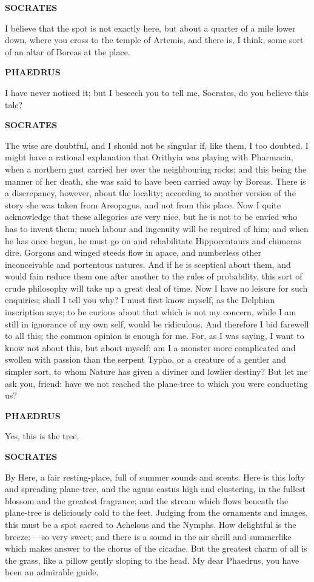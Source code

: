\documentclass[11pt,letter]{article}
\begin{document}
\par \textbf{SOCRATES}
\par   I believe that the spot is not exactly here, but about a quarter of a mile lower down, where you cross to the temple of Artemis, and there is, I think, some sort of an altar of Boreas at the place.

\par \textbf{PHAEDRUS}
\par   I have never noticed it; but I beseech you to tell me, Socrates, do you believe this tale?

\par \textbf{SOCRATES}
\par   The wise are doubtful, and I should not be singular if, like them, I too doubted. I might have a rational explanation that Orithyia was playing with Pharmacia, when a northern gust carried her over the neighbouring rocks; and this being the manner of her death, she was said to have been carried away by Boreas. There is a discrepancy, however, about the locality; according to another version of the story she was taken from Areopagus, and not from this place. Now I quite acknowledge that these allegories are very nice, but he is not to be envied who has to invent them; much labour and ingenuity will be required of him; and when he has once begun, he must go on and rehabilitate Hippocentaurs and chimeras dire. Gorgons and winged steeds flow in apace, and numberless other inconceivable and portentous natures. And if he is sceptical about them, and would fain reduce them one after another to the rules of probability, this sort of crude philosophy will take up a great deal of time. Now I have no leisure for such enquiries; shall I tell you why? I must first know myself, as the Delphian inscription says; to be curious about that which is not my concern, while I am still in ignorance of my own self, would be ridiculous. And therefore I bid farewell to all this; the common opinion is enough for me. For, as I was saying, I want to know not about this, but about myself:  am I a monster more complicated and swollen with passion than the serpent Typho, or a creature of a gentler and simpler sort, to whom Nature has given a diviner and lowlier destiny? But let me ask you, friend:  have we not reached the plane-tree to which you were conducting us?

\par \textbf{PHAEDRUS}
\par   Yes, this is the tree.

\par \textbf{SOCRATES}
\par   By Here, a fair resting-place, full of summer sounds and scents. Here is this lofty and spreading plane-tree, and the agnus castus high and clustering, in the fullest blossom and the greatest fragrance; and the stream which flows beneath the plane-tree is deliciously cold to the feet. Judging from the ornaments and images, this must be a spot sacred to Achelous and the Nymphs. How delightful is the breeze: —so very sweet; and there is a sound in the air shrill and summerlike which makes answer to the chorus of the cicadae. But the greatest charm of all is the grass, like a pillow gently sloping to the head. My dear Phaedrus, you have been an admirable guide.
\end{document}
